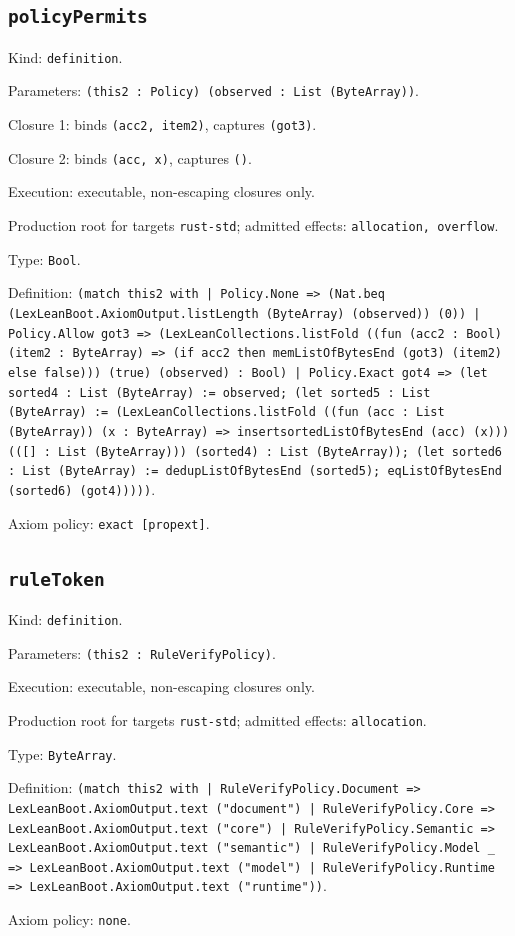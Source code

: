 \documentclass[11pt]{article}
\begin{document}
\subsection*{\texttt{policyPermits}}
\noindent Kind: \texttt{definition}.\par
\noindent Parameters: \texttt{(this2 : Policy) (observed : List (ByteArray))}.\par
\noindent Closure 1: binds \texttt{(acc2, item2)}, captures \texttt{(got3)}.\par
\noindent Closure 2: binds \texttt{(acc, x)}, captures \texttt{()}.\par
\noindent Execution: executable, non-escaping closures only.\par
\noindent Production root for targets \texttt{rust-std}; admitted effects: \texttt{allocation, overflow}.\par
\noindent Type: \texttt{Bool}.\par
\noindent Definition: \texttt{(match this2 with | Policy.None => (Nat.beq (LexLeanBoot.AxiomOutput.listLength (ByteArray) (observed)) (0)) | Policy.Allow got3 => (LexLeanCollections.listFold ((fun (acc2 : Bool) (item2 : ByteArray) => (if acc2 then memListOfBytesEnd (got3) (item2) else false))) (true) (observed) : Bool) | Policy.Exact got4 => (let sorted4 : List (ByteArray) := observed; (let sorted5 : List (ByteArray) := (LexLeanCollections.listFold ((fun (acc : List (ByteArray)) (x : ByteArray) => insertsortedListOfBytesEnd (acc) (x))) (([] : List (ByteArray))) (sorted4) : List (ByteArray)); (let sorted6 : List (ByteArray) := dedupListOfBytesEnd (sorted5); eqListOfBytesEnd (sorted6) (got4)))))}.\par
\noindent Axiom policy: \texttt{exact [propext]}.\par
\subsection*{\texttt{ruleToken}}
\noindent Kind: \texttt{definition}.\par
\noindent Parameters: \texttt{(this2 : RuleVerifyPolicy)}.\par
\noindent Execution: executable, non-escaping closures only.\par
\noindent Production root for targets \texttt{rust-std}; admitted effects: \texttt{allocation}.\par
\noindent Type: \texttt{ByteArray}.\par
\noindent Definition: \texttt{(match this2 with | RuleVerifyPolicy.Document => LexLeanBoot.AxiomOutput.text ("document") | RuleVerifyPolicy.Core => LexLeanBoot.AxiomOutput.text ("core") | RuleVerifyPolicy.Semantic => LexLeanBoot.AxiomOutput.text ("semantic") | RuleVerifyPolicy.Model \_ => LexLeanBoot.AxiomOutput.text ("model") | RuleVerifyPolicy.Runtime => LexLeanBoot.AxiomOutput.text ("runtime"))}.\par
\noindent Axiom policy: \texttt{none}.\par
\end{document}
